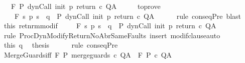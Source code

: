 \begin{isabellebody}
\ \ \ {\isachardoublequoteopen}{\isasymGamma}{\isacharcomma}{\isasymTheta}{\isasymturnstile}\isactrlbsub {\isacharslash}F\isactrlesub \ P\ {\isacharparenleft}dynCall\ init\ p\ return\ c{\isacharparenright}\ Q{\isacharcomma}A{\isachardoublequoteclose}\isanewline
%
\isadelimproof
%
\endisadelimproof
%
\isatagproof
{}\isamarkupfalse%
\ {\isacharminus}\isanewline
\ \ \isamarkupfalse%
\ to{\isacharunderscore}prove\ \isamarkupfalse%
\ \isanewline
\ \ \ \ {\isachardoublequoteopen}{\isasymGamma}{\isacharcomma}{\isasymTheta}{\isasymturnstile}\isactrlbsub {\isacharslash}F\isactrlesub \ {\isacharparenleft}{\isacharbraceleft}s{\isachardot}\ p\ s\ {\isacharequal}\ q{\isacharbraceright}\ {\isasyminter}\ P{\isacharprime}{\isacharparenright}\ {\isacharparenleft}dynCall\ init\ p\ return{\isacharprime}\ c{\isacharparenright}\ Q{\isacharcomma}A{\isachardoublequoteclose}\isanewline
\ \ \ \ \isamarkupfalse%
\ {\isacharparenleft}rule\ conseqPre{\isacharparenright}\ blast\isanewline
\ \ \isamarkupfalse%
\ this\ ret{\isacharunderscore}nrm{\isacharunderscore}modif\ \isanewline
\ \ \isamarkupfalse%
\ {\isachardoublequoteopen}{\isasymGamma}{\isacharcomma}{\isasymTheta}{\isasymturnstile}\isactrlbsub {\isacharslash}F\isactrlesub \ {\isacharparenleft}{\isacharbraceleft}s{\isachardot}\ p\ s\ {\isacharequal}\ q{\isacharbraceright}\ {\isasyminter}\ P{\isacharprime}{\isacharparenright}\ {\isacharparenleft}dynCall\ init\ p\ return\ c{\isacharparenright}\ Q{\isacharcomma}A{\isachardoublequoteclose}\isanewline
\ \ \ \ \isamarkupfalse%
\ {\isacharparenleft}rule\ ProcDynModifyReturnNoAbrSameFaults{\isacharparenright}\ {\isacharparenleft}insert\ modif{\isacharunderscore}clause{\isacharcomma}auto{\isacharparenright}\isanewline
\ \ \isamarkupfalse%
\ this\ q\ \isamarkupfalse%
\ {\isacharquery}thesis\isanewline
\ \ \ \ \isamarkupfalse%
\ {\isacharparenleft}rule\ conseqPre{\isacharparenright}\ \isanewline
{}\isamarkupfalse%
%
\endisatagproof
{\isafoldproof}%
%
\isadelimproof
\isanewline
%
\endisadelimproof
\isanewline
{}\isamarkupfalse%
\ MergeGuards{\isacharunderscore}iff{\isacharcolon}\ {\isachardoublequoteopen}{\isasymGamma}{\isacharcomma}{\isasymTheta}{\isasymturnstile}\isactrlbsub {\isacharslash}F\isactrlesub \ P\ merge{\isacharunderscore}guards\ c\ Q{\isacharcomma}A\ {\isacharequal}\ {\isasymGamma}{\isacharcomma}{\isasymTheta}{\isasymturnstile}\isactrlbsub {\isacharslash}F\isactrlesub \ P\ c\ Q{\isacharcomma}A{\isachardoublequoteclose}\isanewline

\end{isabellebody}
